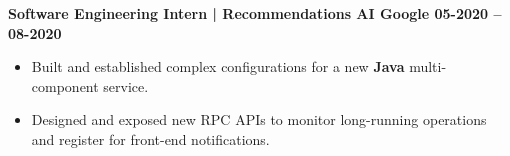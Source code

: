 \textbf{Software Engineering Intern | Recommendations AI \hspace{-10mm} \hfill Google \hfill  05-2020 -- 08-2020}\par

\begin{itemize}
        \item Built and established complex configurations for a new \textbf{Java} multi-component service.
        \item Designed and exposed new RPC APIs to monitor long-running operations and register for front-end notifications.
\end{itemize}\par
